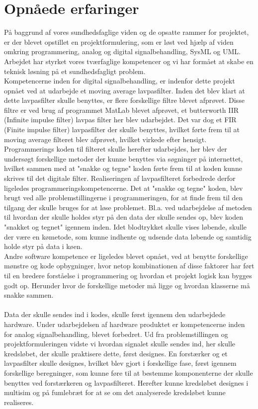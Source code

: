 \section{Opnåede erfaringer}
På baggrund af vores sundhedsfaglige viden og de opsatte rammer for projektet, er der blevet opstillet en projektformulering, som er løst ved hjælp af viden omkring programmering, analog og digital signalbehandling, SysML og UML. Arbejdet har styrket vores tværfaglige kompetencer og vi har formået at skabe en teknisk løsning på et sundhedsfagligt problem.\\
Kompetencerne inden for digital signalbehandling, er indenfor dette projekt opnået ved at udarbejde et moving average lavpasfilter. Inden det blev klart at dette lavpasfilter skulle benyttes, er flere forskellige filtre blevet afprøvet. Disse filtre er ved brug af programmet MatLab blevet afprøvet, et butterworth IIR (Infinite impulse filter) lavpas filter her blev udarbejdet. Det var dog et FIR (Finite impulse filter) lavpasfilter der skulle benyttes, hvilket førte frem til at moving average filteret blev afprøvet, hvilket virkede efter hensigt. \\
Programmerings koden til filteret skulle herefter udarbejdes, her blev der undersøgt forskellige metoder der kunne benyttes via søgninger på internettet, hvilket sammen med at "snakke og tegne" koden førte frem til at koden kunne skrives til det digitale filter. Realiseringen af lavpasfilteret forbedrede derfor ligeledes programmeringskompetencerne. Det at "snakke og tegne" koden, blev brugt ved alle problemstillingerne i programmeringen, for at finde frem til den tilgang der skulle bruges for at løse problemet. Bl.a. ved udarbejdelse af metoden til hvordan der skulle holdes styr på den data der skulle sendes op, blev koden "snakket og tegnet" igennem inden. Idet blodtrykket skulle vises løbende, skulle der være en kømetode, som kunne indhente og udsende data løbende og samtidig holde styr på data i køen.\\
Andre software kompetence er ligeledes blevet opnået, ved at benytte forskellige mønstre og kode opbygninger, hvor netop kombinationen af disse faktorer har ført til en bredere forståelse i programmering og hvordan et projekt logisk kan bygges godt op. Herunder hvor de forskellige metoder må ligge og hvordan klasserne må snakke sammen. \\\\
Data der skulle sendes ind i kodes, skulle først igennem den udarbejdede hardware. Under udarbejdelsen af hardware produktet er kompetencerne inden for analog signalbehandling, blevet forbedret. Ud fra problemstillingen og projektformuleringen vidste vi hvordan signalet skulle sendes ind, her skulle kredsløbet, der skulle praktisere dette, først designes. En forstærker og et lavpasfilter skulle designes, hvilket blev gjort i forskellige fase, først igennem forskellige beregninger, som kunne føre til at bestemme komponenterne der skulle benyttes ved forstærkeren og lavpasfilteret. Herefter kunne kredsløbet designes i multisim og på fumlebræt for at se om det analyserede kredsløbet kunne realiseres. \\\\

